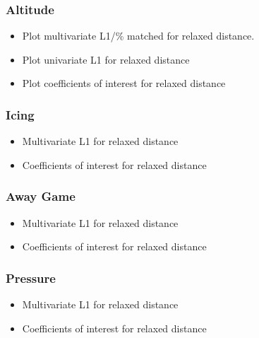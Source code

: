 \subsubsection{Altitude}
\begin{itemize}
    \item Plot multivariate L1/\% matched for relaxed distance.
    \item Plot univariate L1 for relaxed distance
\end{itemize}
\begin{itemize}
    \item Plot coefficients of interest for relaxed distance
\end{itemize}
\subsubsection{Icing}
\begin{itemize}
    \item Multivariate L1 for relaxed distance
\end{itemize}
\begin{itemize}
    \item Coefficients of interest for relaxed distance
\end{itemize}
\subsubsection{Away Game}
\begin{itemize}
    \item Multivariate L1 for relaxed distance
\end{itemize}
\begin{itemize}
    \item Coefficients of interest for relaxed distance
\end{itemize}
\subsubsection{Pressure}
\begin{itemize}
    \item Multivariate L1 for relaxed distance
\end{itemize}
\begin{itemize}
    \item Coefficients of interest for relaxed distance
\end{itemize}
